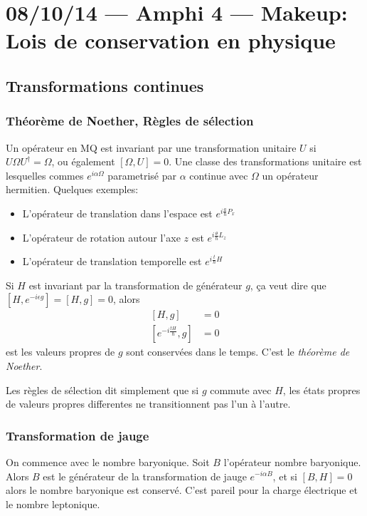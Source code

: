 \documentclass[10pt]{report}
\begin{document}
\chapter{08/10/14 --- Amphi 4 --- Makeup: Lois de conservation en physique}

\section{Transformations continues}

\subsection{Th\'eor\`eme de Noether, R\`egles de s\'election}

Un op\'erateur en MQ est invariant par une transformation unitaire $U$ si $U\Omega U^\dagger = \Omega$, ou \'egalement $\left[ \Omega, U \right] = 0$. Une classe des transformations unitaire est lesquelles commes $e^{i\alpha \Omega}$ parametris\'e par $\alpha$ continue avec $\Omega$ un op\'erateur hermitien. Quelques exemples:
\begin{itemize}
    \item L'op\'erateur de translation dans l'espace est $e^{i \frac{a}{\hbar} P_x}$ 
    \item L'op\'erateur de rotation autour l'axe $z$ est $e^{i\frac{\theta}{\hbar}L_z}$
    \item L'op\'erateur de translation temporelle est $e^{i\frac{t}{\hbar}H}$
\end{itemize}

Si $H$ est invariant par la transformation de g\'en\'erateur $g$, \c{c}a veut dire que $\left[ H, e^{-i\epsilon g} \right] = \left[ H,g \right] = 0$, alors
\begin{align}
    \left[ H,g \right] &= 0\\
    \left[ e^{-i\frac{tH}{\hbar}},g \right] &= 0
\end{align}
est les valeurs propres de $g$ sont conserv\'ees dans le temps. C'est le \emph{th\'eor\`eme de Noether}.

Les r\`egles de s\'election dit simplement que si $g$ commute avec $H$, les \'etats propres de valeurs propres differentes ne transitionnent pas l'un \`a l'autre.

\subsection{Transformation de jauge}

On commence avec le nombre baryonique. Soit $B$ l'op\'erateur nombre baryonique. Alors $B$ est le g\'en\'erateur de la transformation de jauge $e^{-i\alpha B}$, et si $\left[ B,H \right] = 0$ alors le nombre baryonique est conserv\'e. C'est pareil pour la charge \'electrique et le nombre leptonique.
\end{document}
